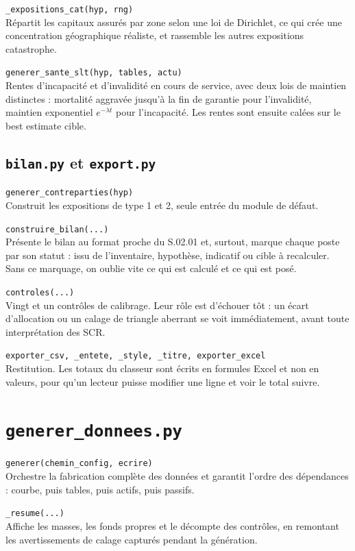 \documentclass[10pt,a4paper]{article}
\newcommand{\fn}[2]{\par\smallskip\textcolor{bleufonce}{\texttt{#1}}\\ #2\par}
\begin{document}
\fn{\_expositions\_cat(hyp, rng)}{Répartit les capitaux assurés par zone selon une loi de
Dirichlet, ce qui crée une concentration géographique réaliste, et rassemble les autres
expositions catastrophe.}

\fn{generer\_sante\_slt(hyp, tables, actu)}{Rentes d'incapacité et d'invalidité en cours de
service, avec deux lois de maintien distinctes : mortalité aggravée jusqu'à la fin de garantie
pour l'invalidité, maintien exponentiel $e^{-\lambda t}$ pour l'incapacité. Les rentes sont
ensuite calées sur le best estimate cible.}

\subsection{\texttt{bilan.py} et \texttt{export.py}}

\fn{generer\_contreparties(hyp)}{Construit les expositions de type 1 et 2, seule entrée du module
de défaut.}

\fn{construire\_bilan(...)}{Présente le bilan au format proche du S.02.01 et, surtout, marque
chaque poste par son statut : issu de l'inventaire, hypothèse, indicatif ou cible à recalculer.
Sans ce marquage, on oublie vite ce qui est calculé et ce qui est posé.}

\fn{controles(...)}{Vingt et un contrôles de calibrage. Leur rôle est d'échouer tôt : un écart
d'allocation ou un calage de triangle aberrant se voit immédiatement, avant toute interprétation
des SCR.}

\fn{exporter\_csv, \_entete, \_style, \_titre, exporter\_excel}{Restitution. Les totaux du
classeur sont écrits en formules Excel et non en valeurs, pour qu'un lecteur puisse modifier une
ligne et voir le total suivre.}

\section{\texttt{generer\_donnees.py}}

\fn{generer(chemin\_config, ecrire)}{Orchestre la fabrication complète des données et garantit
l'ordre des dépendances : courbe, puis tables, puis actifs, puis passifs.}

\fn{\_resume(...)}{Affiche les masses, les fonds propres et le décompte des contrôles, en
remontant les avertissements de calage capturés pendant la génération.}

\end{document}
